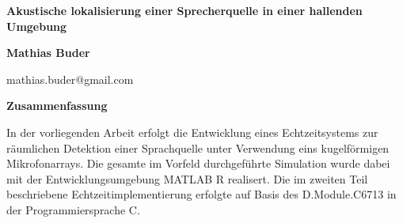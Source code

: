 



\begin{titlepage}
	\begin{center}

		\vspace*{2cm}
		\huge
		\textbf{Akustische lokalisierung einer Sprecherquelle in einer hallenden Umgebung}

		\vspace{2.5cm}
		\large
		\textbf{Mathias Buder}

		\vspace{0.25cm}
		\small
		\textnormal{mathias.buder@gmail.com}
		

		\vspace{3 cm}

		\textbf{Zusammenfassung}

	\end{center}

In der vorliegenden Arbeit erfolgt die Entwicklung eines Echtzeitsystems zur
räumlichen Detektion einer Sprachquelle unter Verwendung eins kugelförmigen
Mikrofonarrays. Die gesamte im Vorfeld durchgeführte Simulation wurde dabei
mit der Entwicklungsumgebung MATLAB R realisert. Die im zweiten Teil beschriebene Echtzeitimplementierung erfolgte auf Basis des D.Module.C6713 in
der Programmiersprache C.

\end{titlepage}

	\tableofcontents								%
	\listoftables									%
	\listoffigures									%
	\lstlistoflistings

